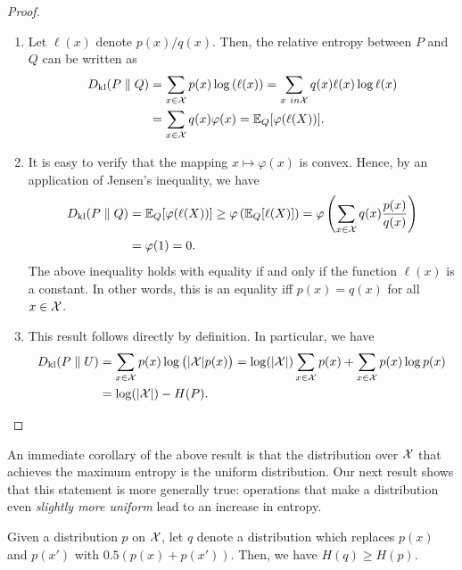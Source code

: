         \begin{proof}
            \begin{enumerate}[label=(\alph*)]
                \item Let $\ell(x)$ denote $p(x)/q(x)$. Then, the relative entropy between $P$ and $Q$ can be written as 
                \begin{align}
                    D_{\text{kl}}(P \parallel Q) &= \sum_{x \in \mathcal{X}} p(x) \log \left( \ell(x) \right)  = \sum_{x\ in \mathcal{X}} q(x) \ell(x) \log \ell(x) \\ 
                    &= \sum_{x \in \mathcal{X}} q(x) \varphi(x) = \mathbb{E}_{Q}[\varphi(\ell(X))]. 
                \end{align}
                \item It is easy to verify that the mapping $x \mapsto \varphi(x)$ is convex. Hence, by an application of Jensen's inequality, we have 
                \begin{align}
                    D_{\text{kl}}(P\parallel Q) &= \mathbb{E}_Q[\varphi(\ell(X))] \geq \varphi\left( \mathbb{E}_Q[\ell(X)] \right) = \varphi\left( \sum_{x \in \mathcal{X}} q(x) \frac{p(x)}{q(x)} \right) \\ 
                    &= \varphi(1) = 0. 
                \end{align}
                The above inequality holds with equality if and only if the function $\ell(x)$ is a constant. In other words, this is an equality iff $p(x)=q(x)$ for all $x \in \mathcal{X}$. 
                \item This result follows directly by definition. In particular, we have 
                \begin{align}
                    D_{\text{kl}}(P\parallel U) &= \sum_{x \in \mathcal{X}} p(x) \log \big(|\mathcal{X}| p(x) \big) = \log(|\mathcal{X}|) \sum_{x \in \mathcal{X}}  p(x) + \sum_{x \in \mathcal{X}} p(x) \log p(x) \\
                    &= \log(|\mathcal{X}|) - H(P).  
                \end{align}
            \end{enumerate}
        \end{proof}
        An immediate corollary of the above result is that the distribution over $\mathcal{X}$ that achieves the maximum entropy is the uniform distribution. Our next result shows that this statement is more generally true: operations that make a distribution even \emph{slightly more uniform} lead to an increase in entropy. 
        \begin{proposition}
        \label{prop:uniform-entropy}
                Given a distribution $p$ on $\mathcal{X}$, let $q$ denote a distribution which replaces $p(x)$ and $p(x')$ with $0.5(p(x)+p(x'))$. Then, we have $H(q) \geq H(p)$. 
        \end{proposition}
